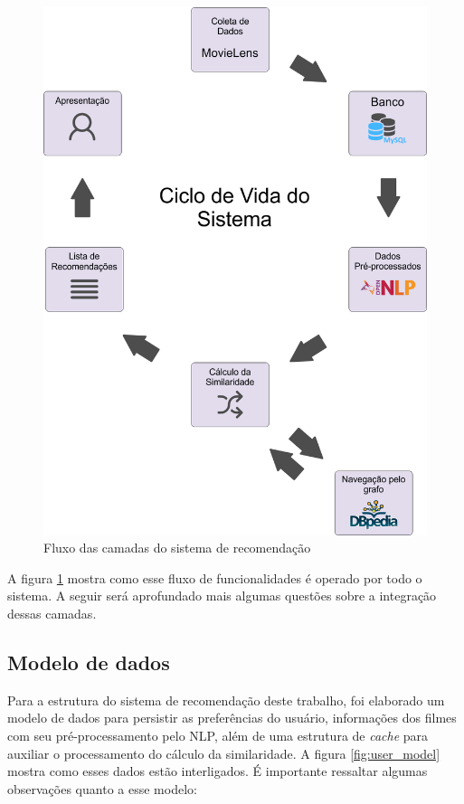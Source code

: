 \begin{figure}
	\centering
	\includegraphics[scale=0.42]{imagens/recsys_fluxo.png}
	\caption{Fluxo das camadas do sistema de recomendação}
	\label{fig:recsys_fluxo}
\end{figure}

A figura \ref{fig:recsys_fluxo} mostra como esse fluxo de funcionalidades é operado por todo o sistema. A seguir será aprofundado mais algumas questões sobre a integração dessas camadas.

\subsection{Modelo de dados}

Para a estrutura do sistema de recomendação deste trabalho, foi elaborado um modelo de dados para persistir as preferências do usuário, informações dos filmes com seu pré-processamento pelo \ac{NLP}, além de uma estrutura de \textit{cache} para auxiliar o processamento do cálculo da similaridade. A figura \ref{fig:user_model} mostra como esses dados estão interligados. É importante ressaltar algumas observações quanto a esse modelo:

